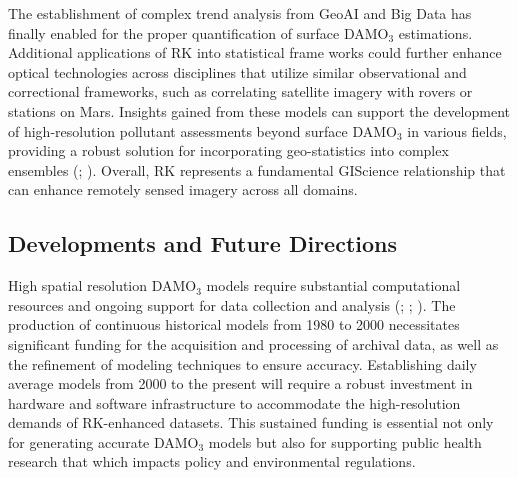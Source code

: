 The establishment of complex trend analysis from GeoAI and Big Data has finally enabled for the proper quantification of surface DAMO$_3$ estimations. Additional applications of RK into statistical frame works could further enhance optical technologies across disciplines that utilize similar observational and correctional frameworks, such as correlating satellite imagery with rovers or stations on Mars. Insights gained from these models can support the development of high-resolution pollutant assessments beyond surface DAMO$_3$ in various fields, providing a robust solution for incorporating geo-statistics into complex ensembles (\cite{cao_deep_2022}; \cite{liu_improve_2018}). Overall, RK represents a fundamental GIScience relationship that can enhance remotely sensed imagery across all domains.
\subsection{Developments and Future Directions} \label{clcsn:developmentanddirections} High spatial resolution DAMO$_3$ models require substantial computational resources and ongoing support for data collection and analysis (\cite{duan_regional_2022}; \cite{rowland_comparative_2024}; \cite{zhou_exposure_2022}). The production of continuous historical models from 1980 to 2000 necessitates significant funding for the acquisition and processing of archival data, as well as the refinement of modeling techniques to ensure accuracy. Establishing daily average models from 2000 to the present will require a robust investment in hardware and software infrastructure to accommodate the high-resolution demands of RK-enhanced datasets. This sustained funding is essential not only for generating accurate DAMO$_3$ models but also for supporting public health research that which impacts policy and environmental regulations.

